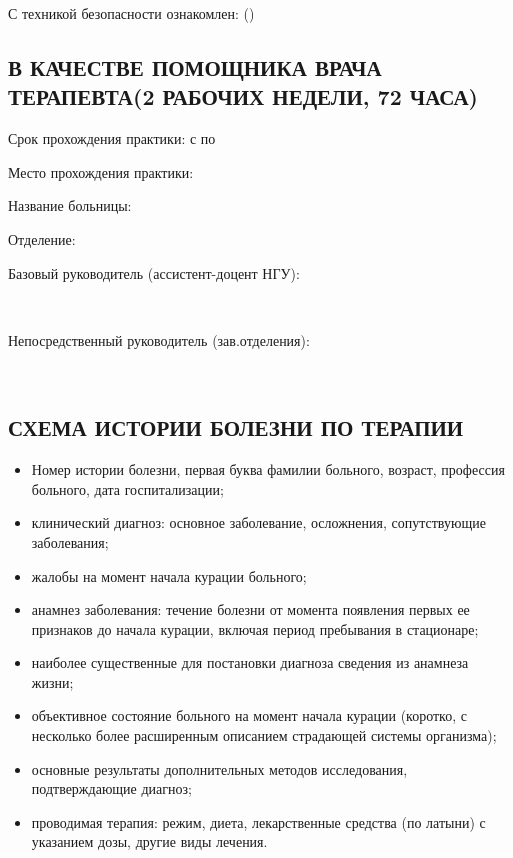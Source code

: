 \documentclass[a4paper,12pt]{extarticle}
\begin{document}
\begin{enumerate}
                                                                                                      \end{enumerate}
С техникой безопасности ознакомлен: \hrulefill (\hrulefill)\\


\newpage
\subsection*{В КАЧЕСТВЕ ПОМОЩНИКА ВРАЧА ТЕРАПЕВТА(2 РАБОЧИХ НЕДЕЛИ, 72 ЧАСА)}


Срок прохождения практики: с \hrulefill по \hrulefill

Место прохождения практики: \hrulefill

Название больницы: \hrulefill

Отделение: \hrulefill

Базовый руководитель (ассистент-доцент НГУ): \hrulefill

~\hrulefill

Непосредственный руководитель (зав.отделения): \hrulefill

~\hrulefill

\subsection*{СХЕМА ИСТОРИИ БОЛЕЗНИ ПО ТЕРАПИИ}

\begin{itemize}
\item Номер истории  болезни,  первая  буква  фамилии  больного,  возраст,  профессия больного, дата госпитализации;
\item клинический  диагноз:  основное  заболевание,  осложнения,  сопутствующие заболевания;
\item жалобы на момент начала курации больного;
\item анамнез заболевания: течение болезни от момента появления первых ее признаков до начала курации, включая период пребывания в стационаре;
\item наиболее существенные для постановки диагноза сведения из анамнеза жизни;
\item объективное состояние больного на момент начала курации (коротко, с несколько более расширенным описанием страдающей системы организма);
\item основные результаты дополнительных методов исследования, подтверждающие диагноз;
\item проводимая  терапия:  режим,  диета,  лекарственные  средства  (по  латыни)  с указанием дозы, другие виды лечения.\end{itemize}
\end{document}
